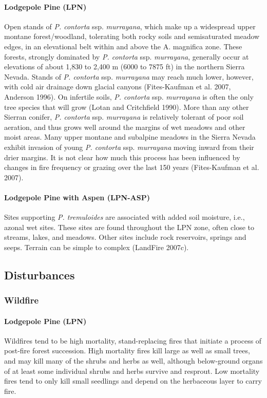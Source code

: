 \paragraph{Lodgepole Pine (LPN)}	Open stands of \emph{P. contorta} ssp. \emph{murrayana}, which make up a widespread upper montane forest/woodland, tolerating both rocky soils and semisaturated meadow edges, in an elevational belt within and above the A. magnifica zone. These forests, strongly dominated by \emph{P. contorta} ssp. \emph{murrayana}, generally occur at elevations of about 1,830 to 2,400 m (6000 to 7875 ft) in the northern Sierra Nevada. Stands of \emph{P. contorta} ssp. \emph{murrayana} may reach much lower, however, with cold air drainage down glacial canyons (Fites-Kaufman et al. 2007, Anderson 1996). On infertile soils, \emph{P. contorta} ssp. \emph{murrayana} is often the only tree species that will grow (Lotan and Critchfield 1990).
More than any other Sierran conifer, \emph{P. contorta} ssp. \emph{murrayana} is relatively tolerant of poor soil aeration, and thus grows well around the margins of wet meadows and other moist areas. Many upper montane and subalpine meadows in the Sierra Nevada exhibit invasion of young \emph{P. contorta} ssp. \emph{murrayana} moving inward from their drier margins. It is not clear how much this process has been influenced by changes in fire frequency or grazing over the last 150 years (Fites-Kaufman et al. 2007).

\paragraph{Lodgepole Pine with Aspen (LPN-ASP)}		Sites supporting \emph{P. tremuloides} are associated with added soil moisture, i.e., azonal wet sites. These sites are found throughout the LPN zone, often close to streams, lakes, and meadows. Other sites include rock reservoirs, springs and seeps. Terrain can be simple to complex (LandFire 2007c). 


\subsection*{Disturbances}

\subsubsection{Wildfire}

\paragraph{Lodgepole Pine (LPN)} 	Wildfires tend to be high mortality, stand-replacing fires that initiate a process of post-fire forest succession. High mortality fires kill large as well as small trees, and may kill many of the shrubs and herbs as well, although below-ground organs of at least some individual shrubs and herbs survive and resprout. Low mortality fires tend to only kill small seedlings and depend on the herbaceous layer to carry fire.

